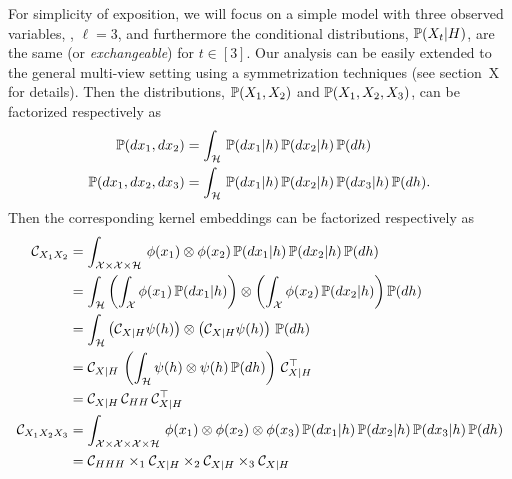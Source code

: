 \documentclass{article}
\begin{document}
For simplicity of exposition, we will focus on a simple model with three observed variables, \ie, $\ell=3$, and furthermore the conditional distributions, $\mathbb{P}(X_t|H)$, are the same (or {\em exchangeable}) for $t \in [3]$. Our analysis can be easily extended to the general multi-view setting using a symmetrization techniques (see section~X for details). Then the distributions, $\mathbb{P}(X_1,X_2)$ and $\mathbb{P}(X_1,X_2,X_3)$, can be factorized respectively as
\begin{align*}
 \mathbb{P}(dx_1, dx_2) &= \int_{\mathcal{H}}\, \mathbb{P}(dx_1 | h )\, \mathbb{P}(d x_2 | h)\, \mathbb{P}(dh) \\
  \mathbb{P}(dx_1, dx_2, dx_3) &= \int_{\mathcal{H}}\, \mathbb{P}(dx_1 | h )\, \mathbb{P}(dx_2 | h)\, \mathbb{P}(dx_3 | h)\, \mathbb{P}(dh).
\end{align*}
Then the corresponding kernel embeddings can be factorized respectively as
\begin{align}
  \mathcal{C}_{X_1X_2}
  &= \int_{\mathcal{X}\times \mathcal{X} \times \mathcal{H}}\, \phi(x_1) \otimes \phi(x_2)\, \mathbb{P}(dx_1 | h )\, \mathbb{P}(dx_2 | h)\, \mathbb{P}(dh) \\
  &= \int_{\mathcal{H}} \left(\int_{\mathcal{X}} \phi(x_1)\, \mathbb{P}(dx_1|h)\right) \otimes \left(\int_{\mathcal{X}} \phi(x_2)\, \mathbb{P}(dx_2 |h)\right) \mathbb{P}(dh) \\
  &= \int_{\mathcal{H}} \left(\mathcal{C}_{X|H} \psi(h)\right) \otimes \left(\mathcal{C}_{X|H} \psi(h)\right)\, \mathbb{P}(dh) \\
  &= \mathcal{C}_{X|H}\, \left(\int_{\mathcal{H}} \psi(h) \otimes \psi(h)\, \mathbb{P}(dh)\right)\, \mathcal{C}_{X|H}^\top\\
  &= \mathcal{C}_{X|H}\, \mathcal{C}_{HH}\, \mathcal{C}_{X|H}^\top \\
  \mathcal{C}_{X_1 X_2 X_3}
  &= \int_{\mathcal{X}\times \mathcal{X} \times \mathcal{X} \times \mathcal{H}}\, \phi(x_1) \otimes \phi(x_2) \otimes \phi(x_3) \, \mathbb{P}(dx_1 | h )\, \mathbb{P}(dx_2 | h)\, \mathbb{P}(dx_3 | h)\,  \mathbb{P}(dh) \\
  &= \mathcal{C}_{HHH} \times_1 \mathcal{C}_{X|H} \times_2 \mathcal{C}_{X|H} \times_3 \mathcal{C}_{X|H}
\end{align}
\end{document}
